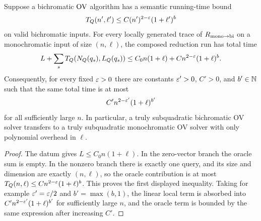 \begin{lemma}
  \label{lem:mono-to-bi-ov-local-cost-transfer}
  Suppose a bichromatic $\mathrm{OV}$ algorithm has a semantic running-time bound
  \[
    T_Q(n',\ell')\leq C(n')^{2-\varepsilon}(1+\ell')^b
  \]
  on valid bichromatic inputs.  For every locally generated trace of
  $R_{\rm mono\to bi}$ on a monochromatic input of size $(n,\ell)$, the
  composed reduction run has total time
  \[
    L+\sum_s T_Q(N_Q(q_s),L_Q(q_s))
    \leq
    C_0n(1+\ell)+C n^{2-\varepsilon}(1+\ell)^b.
  \]
  Consequently, for every fixed $\varepsilon>0$ there are constants
  $\varepsilon'>0$, $C'>0$, and $b'\in\mathbb{N}$ such that the same total time is at most
  \[
    C'n^{2-\varepsilon'}(1+\ell)^{b'}
  \]
  for all sufficiently large $n$.  In particular, a truly subquadratic
  bichromatic OV solver transfers to a truly subquadratic monochromatic OV
  solver with only polynomial overhead in $\ell$.
\end{lemma}
\begin{proof}
  The datum gives $L\leq C_0n(1+\ell)$.  In the zero-vector branch the oracle
  sum is empty.  In the nonzero branch there is exactly one query, and its
  size and dimension are exactly $(n,\ell)$, so the oracle contribution is at
  most $T_Q(n,\ell)\leq Cn^{2-\varepsilon}(1+\ell)^b$.  This proves the first
  displayed inequality.  Taking for example $\varepsilon'=\varepsilon/2$ and
  $b'=\max(b,1)$, the linear local term is absorbed into
  $C'n^{2-\varepsilon'}(1+\ell)^{b'}$ for sufficiently large $n$, and the oracle term
  is bounded by the same expression after increasing $C'$.
\end{proof}

